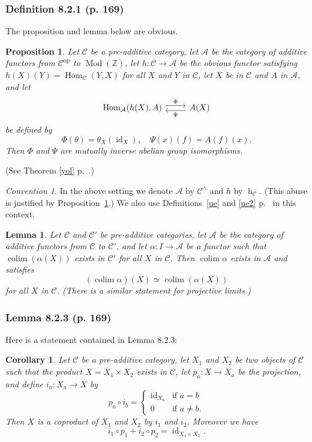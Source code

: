 \documentclass[12pt]{article}
\newtheorem{lem}[thm]{Lemma}
\newtheorem{prop}[thm]{Proposition}
\newtheorem{cor}[thm]{Corollary}
\theoremstyle{remark}
\newtheorem{conv}[thm]{Convention}
\theoremstyle{definition}
\newcommand{\nn}{\noindent}
\newcommand{\bb}{\mathbb}
\newcommand{\A}{\mathcal A}
\newcommand{\C}{\mathcal C}
\DeclareMathOperator*{\colim}{colim}
\DeclareMathOperator{\hy}{h}
\DeclareMathOperator{\id}{id}
\DeclareMathOperator{\Hom}{Hom}
\DeclareMathOperator{\Mod}{Mod}
\DeclareMathOperator{\op}{op}
\begin{document}
\subsubsection{Definition 8.2.1 (p. 169)}

The proposition and lemma below are obvious. 
%
\begin{prop}\label{payp}
Let $\C$ be a pre-additive category, let $\A$ be the category of additive functors from $\C^{\op}$ to $\Mod(\bb Z)$, let $h:\C\to\A$ be the obvious functor satisfying $h(X)(Y)=\Hom_\C(Y,X)$ for all $X$ and $Y$ in $\C$, let $X$ be in $\C$ and $A$ in $\A$, and let 
$$
\begin{tikzcd}
\Hom_\A(h(X),A)\ar[yshift=.7ex]{r}{\Phi}&A(X)\ar[yshift=-.7ex]{l}{\Psi}
\end{tikzcd}
$$
be defined by 
$$
\Phi(\theta)=\theta_X(\id_X),\quad\Psi(x)(f)=A(f)(x).
$$
Then $\Phi$ and $\Psi$ are mutually inverse abelian group isomorphisms.
\end{prop}
%
\nn(See Theorem \ref{yol} p.~\pageref{yol}.)

\begin{conv}\label{payc}
In the above setting we denote $\A$ by $\C^\wedge$ and $h$ by $\hy_\C$. (This abuse is justified by Proposition~\ref{payp}.) We also use Definitions~\ref{ue} and \ref{ue2} p.~\pageref{ue} in this context. 
\end{conv} 

\begin{lem}\label{payl}
Let $\C$ and $\C'$ be pre-additive categories, let $\A$ be the category of additive functors from $\C$ to $\C'$, and let $\alpha:I\to\A$ be a functor such that $\colim(\alpha(X))$ exists in $\C'$ for all $X$ in $\C$. Then $\colim\alpha$ exists in $\A$ and satisfies 
$$
(\colim\alpha)(X)\simeq\colim(\alpha(X))
$$ 
for all $X$ in $\C$. (There is a similar statement for projective limits.)
\end{lem}


\subsubsection{Lemma 8.2.3 (p. 169)}

Here is a statement contained in Lemma 8.2.3:

\begin{cor}\label{823}
Let $\C$ be a pre-additive category, let $X_1$ and $X_2$ be two objects of $\C$ such that the product $X=X_1\times X_2$ exists in $\C$, let $p_a:X\to X_a$ be the projection, and define $i_a:X_a\to X$ by 
$$
p_a\circ i_b=\begin{cases}\id_{X_a}&\text{if }a=b\\0&\text{if }a\not=b.\end{cases}
$$ 
Then $X$ is a coproduct of $X_1$ and $X_2$ by $i_1$ and $i_2$. Moreover we have 
$$
i_1\circ p_1+i_2\circ p_2=\id_{X_1\times X_2}.
$$
\end{cor}
\end{document}
